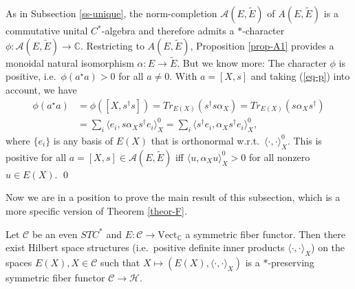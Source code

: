 \documentclass[11pt]{article}
\theoremstyle{definition}
\theoremstyle{definition}
\theoremstyle{remark}
\newcommand{\Vect}{\mathrm{Vect}}
\def\2#1{{\mathcal #1}}
\def\7#1{{\mathbb #1}}
\newcommand{\rarr}{\rightarrow}
\begin{document}
\prf As in Subsection \ref{ss-unique}, the norm-completion
$\2A(E,\widetilde{E})$ of $A(E,\widetilde{E})$ is a commutative unital
$C^*$-algebra and therefore admits a $*$-character
$\phi:\2A(E,\widetilde{E})\rarr\7C$. Restricting to
$A(E,\widetilde{E})$, Proposition \ref{prop-A1} provides a monoidal
natural isomorphism $\alpha:E\rarr\widetilde{E}$. But we know more:
The character $\phi$ is positive, i.e.\ $\phi(a^\star a)>0$ for all
$a\ne 0$. With $a=[X,s]$ and taking (\ref{eq-p}) into account, we have
\[ \begin{aligned} \phi(a^\star a) &=\phi([X,s^\dagger s])=Tr_{E(X)}(s^\dagger s\alpha_X)=Tr_{E(X)}(s\alpha_Xs^\dagger)
  \\
&= \sum_i \langle e_i, s\alpha_X s^\dagger e_i\rangle_X^0 =\sum_i \langle s^\dagger e_i, \alpha_X
  s^\dagger e_i\rangle_X^0, \end{aligned} \]
where $\{e_i\}$ is any basis of $E(X)$ that is orthonormal w.r.t.\ $\langle\cdot,\cdot\rangle_X^0$.
This is positive for all $a=[X,s]\in\2A(E,\widetilde{E})$ iff $\langle u,\alpha_Xu\rangle_X^0>0$ for
all nonzero $u\in E(X)$. 
\qed

Now we are in a position to prove the main result of this subsection, which is a more specific
version of Theorem \ref{theor-F}.

\btheor \label{theor-starfunc} Let $\2C$ be an even $STC^*$ and
$E:\2C\rarr\Vect_\7C$ a symmetric fiber functor. Then there exist
Hilbert space structures (i.e.\ positive definite inner products
$\langle\cdot,\cdot\rangle_X$) on the spaces $E(X),X\in\2C$ such that
$X\mapsto (E(X),\langle\cdot,\cdot\rangle_X)$ is a $*$-preserving
symmetric fiber functor $\2C\rarr\2H$.  \etheor
\end{document}
